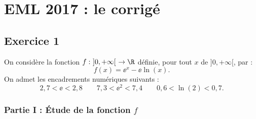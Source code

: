 \chapter*{EML 2017 : le corrigé}
  
%

\section*{Exercice 1}
\noindent
On considère la fonction $f : \ ]0,+\infty[ \ \rightarrow \R$ définie,
pour tout $x$ de $]0,+\infty[$, par :
\[
f(x)=\ee^x-\ee \ln(x).
\]
On admet les encadrements numériques suivants :
\[
2,7<\ee<2,8 \qquad 7,3<\ee^2<7,4 \qquad 0,6<\ln(2)<0,7.
\]

\subsection*{Partie I : Étude de la fonction $f$}

